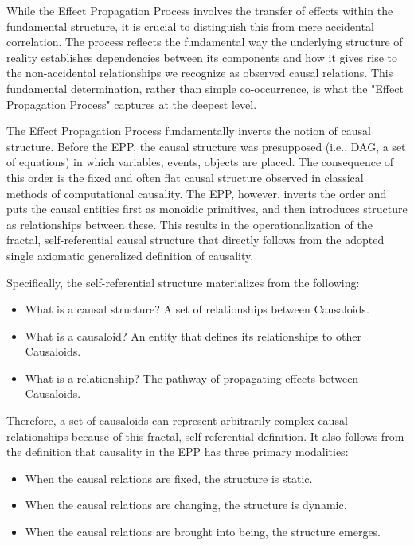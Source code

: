While the Effect Propagation Process involves the transfer of effects within the fundamental structure, it is crucial to distinguish this from mere accidental correlation. The process reflects the fundamental way the underlying structure of reality establishes dependencies between its components and how it gives rise to the non-accidental relationships we recognize as observed causal relations. This fundamental determination, rather than simple co-occurrence, is what the "Effect Propagation Process" captures at the deepest level.

 The Effect Propagation Process fundamentally inverts the notion of causal structure. Before the EPP, the causal structure was presupposed (i.e., DAG, a set of equations) in which variables, events, objects are placed. The consequence of this order is the fixed and often flat causal structure observed in classical methods of computational causality. The EPP, however, inverts the order and puts the causal entities first as monoidic primitives, and then introduces structure as relationships between these. This results in the operationalization of the fractal, self-referential causal structure that directly follows from the adopted single axiomatic generalized definition of causality. 
 
Specifically, the self-referential structure materializes from the following:

\begin{itemize}
	\item What is a causal structure? A set of relationships between Causaloids.
 	\item What is a causaloid? An entity that defines its relationships to other Causaloids. 
	\item What is a relationship? The pathway of propagating effects between Causaloids.
\end{itemize}

Therefore, a set of causaloids can represent arbitrarily complex causal relationships because of this fractal, self-referential definition. It also follows from the definition that causality in the EPP has three primary modalities:
\begin{itemize}
	\item When the causal relations are fixed, the structure is static.
 	\item When the causal relations are changing, the structure is dynamic. 
 	\item When the causal relations are brought into being, the structure emerges. 
\end{itemize}

